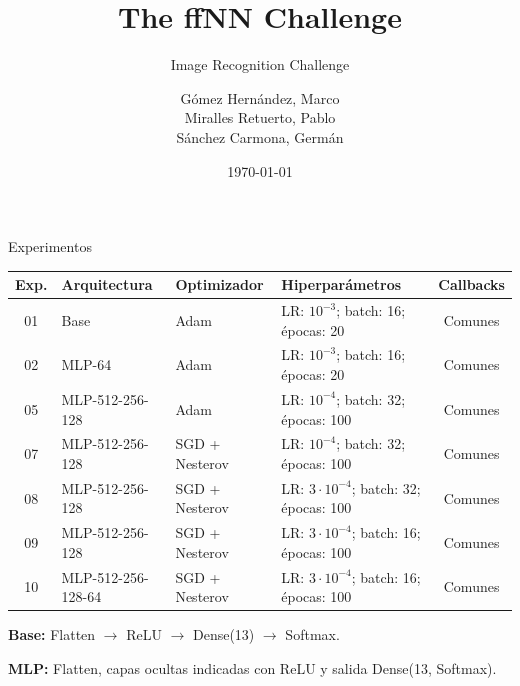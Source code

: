 \documentclass{beamer}
\title{The ffNN Challenge}
\subtitle{Image Recognition Challenge}
\author[Gómez, Miralles y Sánchez]{
    Gómez Hernández, Marco \\
    Miralles Retuerto, Pablo \\
    Sánchez Carmona, Germán
}
\institute[UPM]{
    Universidad Politécnica de Madrid\\
    Máster Universitario en Inteligencia Artificial\\
    Visión por Computador
}
\date{\today}
\begin{document}
\begin{frame}
    \titlepage
\end{frame}


\begin{frame}{Experimentos}
    \scriptsize
    \setlength{\tabcolsep}{3pt}
    \renewcommand{\arraystretch}{1.4}

    \begin{tabularx}{\textwidth}{@{}c l l X c@{}}
        \toprule
        \textbf{Exp.} &
        \textbf{Arquitectura} &
        \textbf{Optimizador} &
        \textbf{Hiperparámetros} &
        \textbf{Callbacks} \\
        \midrule

        01 & Base & Adam
        & LR: $10^{-3}$; batch: 16; épocas: 20
        & Comunes \\

        02 & MLP-64 & Adam
        & LR: $10^{-3}$; batch: 16; épocas: 20
        & Comunes \\

        05 & MLP-512-256-128 & Adam
        & LR: $10^{-4}$; batch: 32; épocas: 100
        & Comunes \\

        07 & MLP-512-256-128 & SGD + Nesterov
        & LR: $10^{-4}$; batch: 32; épocas: 100
        & Comunes \\

        08 & MLP-512-256-128 & SGD + Nesterov
        & LR: $3\cdot10^{-4}$; batch: 32; épocas: 100
        & Comunes \\

        09 & MLP-512-256-128 & SGD + Nesterov
        & LR: $3\cdot10^{-4}$; batch: 16; épocas: 100
        & Comunes \\

        10 & MLP-512-256-128-64 & SGD + Nesterov
        & LR: $3\cdot10^{-4}$; batch: 16; épocas: 100
        & Comunes \\

        \bottomrule
    \end{tabularx}

    \medskip
    \textbf{Base:}
    Flatten $\rightarrow$ ReLU $\rightarrow$ Dense(13)
    $\rightarrow$ Softmax.

    \medskip
    \textbf{MLP:}
    Flatten, capas ocultas indicadas con ReLU
    y salida Dense(13, Softmax).

\end{frame}
\end{document}

